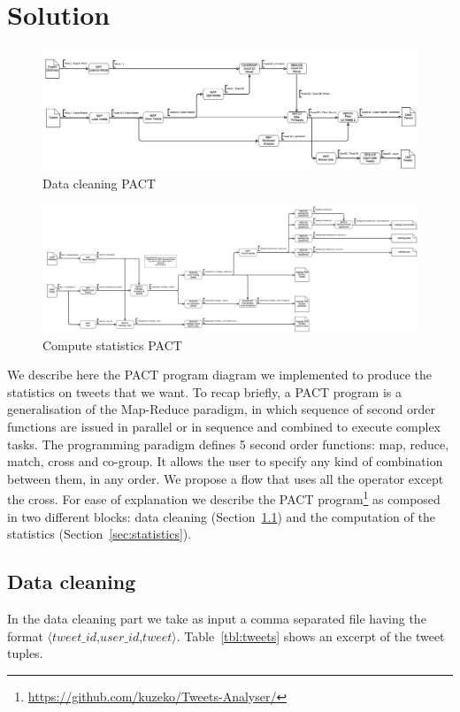 \section{Solution}
\label{sec:solution}

\begin{figure}[!Ht]
\includegraphics[width=\textwidth]{images/strato_pact_pt1.png} 
\caption{Data cleaning PACT}
\label{fig:cleaning}
\end{figure}

\begin{figure}[!Ht]
\includegraphics[width=\textwidth]{images/strato_pact_pt2.png} 
\caption{Compute statistics PACT}
\label{fig:statistics}
\end{figure}

We describe here the PACT program diagram we implemented to produce the statistics on tweets that we want. 
To recap briefly, a PACT program is a generalisation of the Map-Reduce paradigm, in which sequence of second order functions are issued in parallel or in sequence and combined to execute complex tasks. 
The programming paradigm defines 5 second order functions: map, reduce, match, cross and co-group.
It allows the user to specify any kind of combination between them, in any order.
We propose a flow that uses all the operator except the cross.
For ease of explanation we describe the PACT program\footnote{\url{https://github.com/kuzeko/Tweets-Analyser/}} as composed in two different blocks: data cleaning (Section~\ref{sec:cleaning}) and the computation of the statistics (Section~\ref{sec:statistics}).

\subsection{Data cleaning}
\label{sec:cleaning}
In the data cleaning part we take as input a comma separated file having the format $\langle tweet\_id$,$user\_id$,$tweet \rangle$. 
Table~\ref{tbl:tweets} shows an excerpt of the tweet tuples. 

